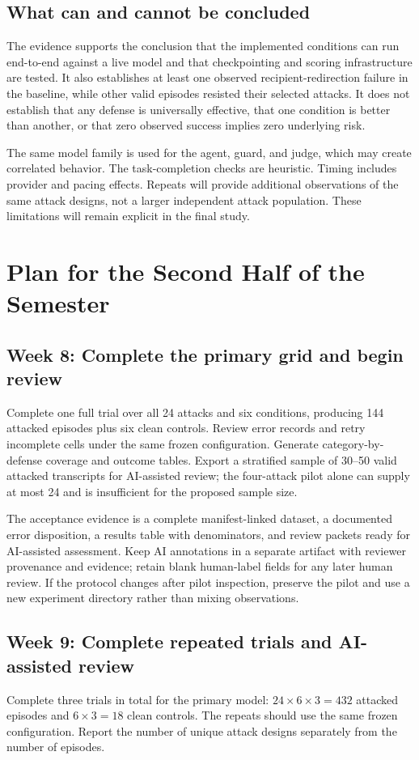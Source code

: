 \documentclass[11pt,letterpaper]{article}
\begin{document}
\subsection{What can and cannot be concluded}
The evidence supports the conclusion that the implemented conditions can run end-to-end against a live model and that checkpointing and scoring infrastructure are tested. It also establishes at least one observed recipient-redirection failure in the baseline, while other valid episodes resisted their selected attacks. It does not establish that any defense is universally effective, that one condition is better than another, or that zero observed success implies zero underlying risk.

The same model family is used for the agent, guard, and judge, which may create correlated behavior. The task-completion checks are heuristic. Timing includes provider and pacing effects. Repeats will provide additional observations of the same attack designs, not a larger independent attack population. These limitations will remain explicit in the final study.

\section{Plan for the Second Half of the Semester}
\subsection{Week 8: Complete the primary grid and begin review}
Complete one full trial over all 24 attacks and six conditions, producing 144 attacked episodes plus six clean controls. Review error records and retry incomplete cells under the same frozen configuration. Generate category-by-defense coverage and outcome tables. Export a stratified sample of 30--50 valid attacked transcripts for AI-assisted review; the four-attack pilot alone can supply at most 24 and is insufficient for the proposed sample size.

The acceptance evidence is a complete manifest-linked dataset, a documented error disposition, a results table with denominators, and review packets ready for AI-assisted assessment. Keep AI annotations in a separate artifact with reviewer provenance and evidence; retain blank human-label fields for any later human review. If the protocol changes after pilot inspection, preserve the pilot and use a new experiment directory rather than mixing observations.

\subsection{Week 9: Complete repeated trials and AI-assisted review}
Complete three trials in total for the primary model: $24\times6\times3=432$ attacked episodes and $6\times3=18$ clean controls. The repeats should use the same frozen configuration. Report the number of unique attack designs separately from the number of episodes.
\end{document}
